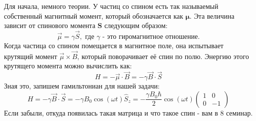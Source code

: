 Для начала, немного теории. У частиц со спином есть так называемый собственный магнитный момент, который обозначается как $\boldsymbol{\mu}$. Эта величина зависит от спинового момента $\mathbf{S}$ следующим образом:
\[
\vec{\mu} = \gamma \vec{S}, \text{ где $\gamma$ - это гиромагнитное отношение.}
\]
Когда частица со спином помещается в магнитное поле, она испытывает крутящий момент $\vec{\mu} \times \vec{B}$, который поворачивает её спин по полю. Энергию этого крутящего момента можно вычислить как:
\[
H = -\vec{\mu}\cdot\vec{B} = -\gamma\vec{B}\cdot\vec{S}
\]
Зная это, запишем гамильтониан для нашей задачи:
\[
H = -\gamma\vec{B}\cdot\vec{S} = -\gamma B_0\cos(\omega t) \hat{S}_z = -\frac{\gamma B_0\hbar}{2}\cos(\omega t)\begin{pmatrix} 1 & 0 \\ 0 & -1 \end{pmatrix}
\]
Если забыли, откуда появилась такая матрица и что такое спин - вам в 8 семинар. 

